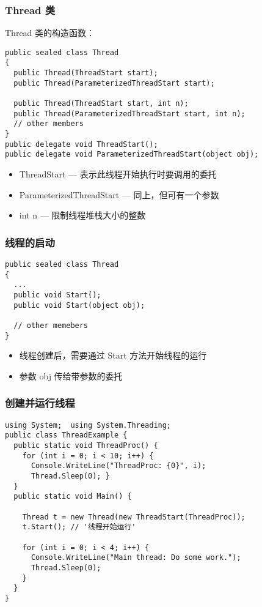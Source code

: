 \begin{frame}[fragile]
\frametitle{Thread 类}
Thread 类的构造函数：
\begin{lstlisting}
public sealed class Thread
{
  public Thread(ThreadStart start);
  public Thread(ParameterizedThreadStart start);

  public Thread(ThreadStart start, int n);
  public Thread(ParameterizedThreadStart start, int n);
  // other members
}
public delegate void ThreadStart();
public delegate void ParameterizedThreadStart(object obj);
\end{lstlisting}

\begin{itemize}
\item ThreadStart --- 表示此线程开始执行时要调用的委托
\item ParameterizedThreadStart --- 同上，但可有一个参数
\item int n --- 限制线程堆栈大小的整数
\end{itemize}
\end{frame}

\begin{frame}[fragile]
\frametitle{线程的启动}
\begin{lstlisting}
public sealed class Thread
{
  ...
  public void Start();
  public void Start(object obj);

  // other memebers
}
\end{lstlisting}
\begin{itemize}
\item 线程创建后，需要通过 Start 方法开始线程的运行
\item 参数 obj 传给带参数的委托
\end{itemize}
\end{frame}

\begin{frame}[fragile]
\frametitle{创建并运行线程}
\begin{lstlisting}[escapeinside='']
using System;  using System.Threading;
public class ThreadExample {
  public static void ThreadProc() {
    for (int i = 0; i < 10; i++) {
      Console.WriteLine("ThreadProc: {0}", i);
      Thread.Sleep(0); }
  }
  public static void Main() {

    Thread t = new Thread(new ThreadStart(ThreadProc));
    t.Start(); // '线程开始运行'

    for (int i = 0; i < 4; i++) {
      Console.WriteLine("Main thread: Do some work.");
      Thread.Sleep(0);
    }
  }
}
\end{lstlisting}
\end{frame}

